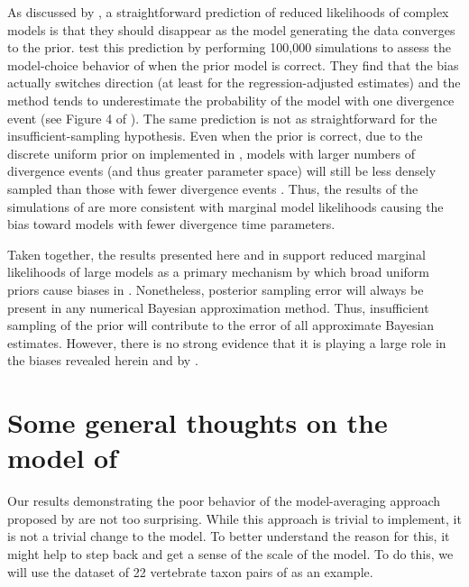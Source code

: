 \documentclass[letterpaper,12pt]{article}
\begin{document}
\begin{linenumbers}
As discussed by \citet{Oaks2012}, a straightforward prediction of reduced
likelihoods of complex models is that they should disappear as the model
generating the data converges to the prior.
\citet{Oaks2012} test this prediction by performing 100,000 simulations to
assess the model-choice behavior of \msb when the prior model is correct.
They find that the bias actually switches direction (at least for the
regression-adjusted estimates) and the method tends to underestimate the
probability of the model with one divergence event (see Figure 4 of
\citet{Oaks2012}).
The same prediction is not as straightforward for the insufficient-sampling
hypothesis.
Even when the prior is correct, due to the discrete uniform prior on
\numt{} implemented in \msb, models with larger numbers of divergence
events (and thus greater parameter space) will still be less densely
sampled than those with fewer divergence events \citep{Oaks2012}.
Thus, the results of the simulations of \citet{Oaks2012} are more consistent
with marginal model likelihoods causing the bias toward models with fewer
divergence time parameters.

Taken together, the results presented here and in \citet{Oaks2012} support
reduced marginal likelihoods of large models as a primary mechanism by which
broad uniform priors cause biases in \msb.
Nonetheless, posterior sampling error will always be present in any numerical
Bayesian approximation method.
Thus, insufficient sampling of the prior will contribute to the error of all
approximate Bayesian estimates.
However, there is no strong evidence that it is playing a large role in
the biases revealed herein and by \citet{Oaks2012}.




\section*{Some general thoughts on the model of \msb}
Our results demonstrating the poor behavior of the model-averaging approach
proposed by \citet{Hickerson2013} are not too surprising.
While this approach is trivial to implement, it is not a trivial change
to the \msb model.
To better understand the reason for this, it might help to step back and get a
sense of the scale of the \msb model.
To do this, we will use the dataset of 22 vertebrate taxon pairs of
\citet{Oaks2012} as an example.


\end{linenumbers}
\end{document}
